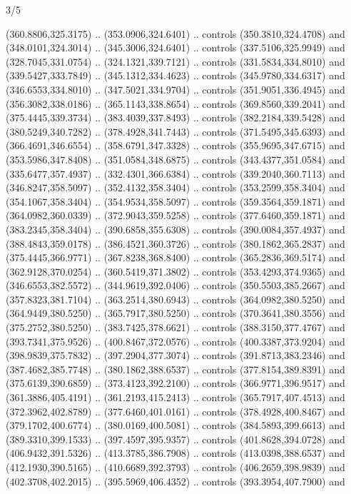 \begin{flagdescription}{3/5}
\begin{scope}[xshift=0.5\flaglength]
\begin{scope}[scale=0.00167\flagwidth,yshift=210.9mm,xshift=-175.8mm]
\begin{scope}[y=-1pt, x=1pt]
  (360.8806,325.3175) .. (353.0906,324.6401) .. controls (350.3810,324.4708) and
  (348.0101,324.3014) .. (345.3006,324.6401) .. controls (337.5106,325.9949) and
  (328.7045,331.0754) .. (324.1321,339.7121) .. controls (331.5834,334.8010) and
  (339.5427,333.7849) .. (345.1312,334.4623) .. controls (345.9780,334.6317) and
  (346.6553,334.8010) .. (347.5021,334.9704) .. controls (351.9051,336.4945) and
  (356.3082,338.0186) .. (365.1143,338.8654) .. controls (369.8560,339.2041) and
  (375.4445,339.3734) .. (383.4039,337.8493) .. controls (382.2184,339.5428) and
  (380.5249,340.7282) .. (378.4928,341.7443) .. controls (371.5495,345.6393) and
  (366.4691,346.6554) .. (358.6791,347.3328) .. controls (355.9695,347.6715) and
  (353.5986,347.8408) .. (351.0584,348.6875) .. controls (343.4377,351.0584) and
  (335.6477,357.4937) .. (332.4301,366.6384) .. controls (339.2040,360.7113) and
  (346.8247,358.5097) .. (352.4132,358.3404) .. controls (353.2599,358.3404) and
  (354.1067,358.3404) .. (354.9534,358.5097) .. controls (359.3564,359.1871) and
  (364.0982,360.0339) .. (372.9043,359.5258) .. controls (377.6460,359.1871) and
  (383.2345,358.3404) .. (390.6858,355.6308) .. controls (390.0084,357.4937) and
  (388.4843,359.0178) .. (386.4521,360.3726) .. controls (380.1862,365.2837) and
  (375.4445,366.9771) .. (367.8238,368.8400) .. controls (365.2836,369.5174) and
  (362.9128,370.0254) .. (360.5419,371.3802) .. controls (353.4293,374.9365) and
  (346.6553,382.5572) .. (344.9619,392.0406) .. controls (350.5503,385.2667) and
  (357.8323,381.7104) .. (363.2514,380.6943) .. controls (364.0982,380.5250) and
  (364.9449,380.5250) .. (365.7917,380.5250) .. controls (370.3641,380.3556) and
  (375.2752,380.5250) .. (383.7425,378.6621) .. controls (388.3150,377.4767) and
  (393.7341,375.9526) .. (400.8467,372.0576) .. controls (400.3387,373.9204) and
  (398.9839,375.7832) .. (397.2904,377.3074) .. controls (391.8713,383.2346) and
  (387.4682,385.7748) .. (380.1862,388.6537) .. controls (377.8154,389.8391) and
  (375.6139,390.6859) .. (373.4123,392.2100) .. controls (366.9771,396.9517) and
  (361.3886,405.4191) .. (361.2193,415.2413) .. controls (365.7917,407.4513) and
  (372.3962,402.8789) .. (377.6460,401.0161) .. controls (378.4928,400.8467) and
  (379.1702,400.6774) .. (380.0169,400.5081) .. controls (384.5893,399.6613) and
  (389.3310,399.1533) .. (397.4597,395.9357) .. controls (401.8628,394.0728) and
  (406.9432,391.5326) .. (413.3785,386.7908) .. controls (413.0398,388.6537) and
  (412.1930,390.5165) .. (410.6689,392.3793) .. controls (406.2659,398.9839) and
  (402.3708,402.2015) .. (395.5969,406.4352) .. controls (393.3954,407.7900) and

\end{scope}
\end{scope}
\end{scope}
\end{flagdescription}
